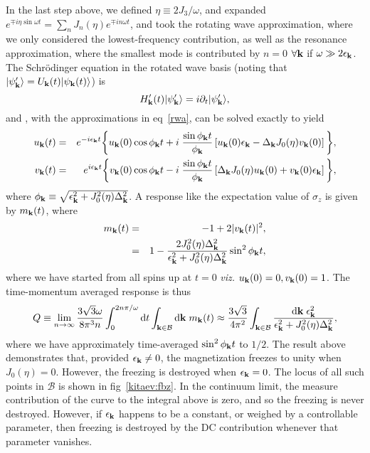 \documentclass[a4paper,10pt]{article}
\begin{document}
In the last step above, we defined $\eta\equiv 2 J_3/\omega$, and expanded $e^{\mp i\eta\sin{\omega t}}=\sum_n J_n(\eta) e^{\mp i n \omega t}$, and took the rotating wave approximation, where we only considered the lowest-frequency contribution, as well as the resonance approximation, where the smallest mode is contributed by $n=0$ $\forall {\bf k}$ if $\omega\gg2\epsilon_{\bf k}$. The Schr\"odinger equation in the rotated wave basis (noting that $|\psi'_{\bf k}\rangle = U_{\bf k}(t)|\psi_{\bf k}(t)\rangle$) is
\begin{equation}
H'_{\bf k}(t)  |\psi'_{\bf k}\rangle = i\partial_t |\psi'_{\bf k}\rangle,
\end{equation}
and , with the approximations in eq~\ref{rwa}, can be solved exactly to yield
\begin{eqnarray}
u_{\bf k}(t) &=& e^{-i \epsilon_{\bf k}t } \bigg\{u_{\bf k}(0)\cos{\phi_{\bf k}t}+i\; \frac{\sin{\phi_{\bf k}t}}{\phi_{\bf k}} \left[u_{\bf k}(0) \epsilon_{\bf k} -\Delta_{\bf k}  J_0(\eta) v_{\bf k}(0)\right]\bigg\} , \nonumber \\
v_{\bf k}(t) &=& e^{i\epsilon_{\bf k}t } \bigg\{v_{\bf k}(0) \cos{\phi_{\bf k}t}-i\; \frac{\sin{\phi_{\bf k}t}}{\phi_{\bf k}} \left[\Delta_{\bf k}  J_0(\eta) u_{\bf k}(0)+v_{\bf k}(0) \epsilon_{\bf k} \right]\bigg\}, \nonumber \\
\end{eqnarray}
where $\phi_{\bf k}\equiv \sqrt{\epsilon^2_{\bf k}+J^2_0(\eta)\Delta^2_{\bf k}}$. A response like the expectation value of $\sigma_z$ is given by $m_{\bf k}(t)$, where
\begin{eqnarray}
 m_{\bf k}(t) &=& -1+ 2 |v_{\bf k}(t)|^2, \nonumber \\
              &=& 1- \frac{2J^2_0(\eta)\Delta^2_{\bf k}}{\epsilon^2_{\bf k}+J^2_0(\eta)\Delta^2_{\bf k}}\sin^2{\phi_{\bf k}t},
\end{eqnarray}
where we have started from all spins up at $t=0$ \textit{viz.} $u_{\bf k}(0)=0,v_{\bf k}(0)=1$. The time-momentum averaged response is thus
\begin{equation}
Q \equiv \lim_{n\rightarrow\infty}\frac{3\sqrt{3}\omega}{8\pi^3 n}\int^{2n\pi/\omega}_0 \mathrm{d} t \int_{{\bf k}\in\mathcal{B}}\mathrm{d}{\bf k}\; m_{\bf k}(t)\approx \frac{3\sqrt{3}}{4\pi^2}\int_{{\bf k}\in\mathcal{B}}\frac{\mathrm{d}{\bf k}\; \epsilon^2_{\bf k}}{\epsilon^2_{\bf k}+J^2_0(\eta)\Delta^2_{\bf k}},
\end{equation}
where we have approximately time-averaged $\sin^2{\phi_{\bf k}t}$ to $1/2$. The result above demonstrates that, provided $\epsilon_{\bf k}\neq0$, the magnetization freezes to unity when $J_0(\eta)=0$. However, the freezing is destroyed when $\epsilon_{\bf k}=0$. The locus of all such points in $\mathcal{B}$ is shown in fig~\ref{kitaev:fbz}. In the continuum limit, the measure contribution of the curve to the integral above is zero, and so the freezing is never destroyed. However, if $\epsilon_{\bf k}$ happens to be a constant, or weighed by a controllable parameter, then freezing is destroyed by the DC contribution whenever that parameter vanishes.
\end{document}
